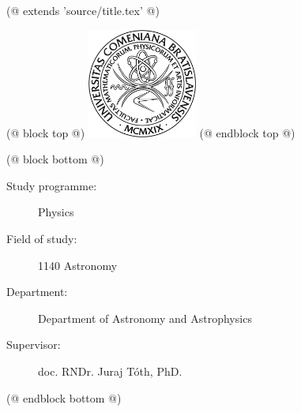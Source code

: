 (@ extends 'source/title.tex' @)

(@ block top @)
    \includegraphics[keepaspectratio = true, width = 36mm]{source/pictures/fmfi.jpg}
    \vspace{10mm}
(@ endblock top @)

(@ block bottom @)
    \vspace{40mm}
    {
        \footnotesize
        \begin{description}
            \item[Study programme:] Physics
            \item[Field of study:]  1140 Astronomy
            \item[Department:]      Department of Astronomy and Astrophysics
            \item[Supervisor:]      doc. RNDr. Juraj Tóth, PhD.
        \end{description}
    }
(@ endblock bottom @)
